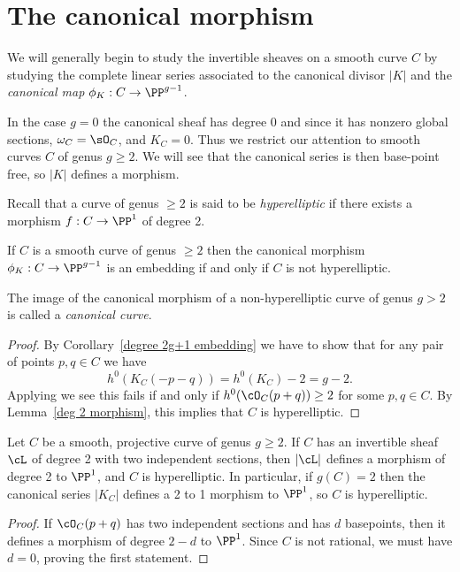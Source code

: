 \section{The canonical morphism}

We will generally begin to study the invertible sheaves on a smooth curve $C$ by studying the complete linear series associated to the canonical divisor $|K|$ and the \emph{canonical map}
 $\phi_K : C \to \PP^{g-1}$. 
 
 In the case $g=0$ the canonical sheaf has degree 0 and since it has nonzero global sections, 
 $\omega_C = \sO_C$, and $K_C = 0$. Thus we restrict our attention to smooth curves $C$ of genus $g\geq 2$. We will see
 that the canonical series is then base-point free, so $|K|$ defines a morphism.

Recall that a curve of genus $\geq 2$
is said to be \emph{hyperelliptic} if there exists a morphism $f: C \to \PP^1$ of degree 2. 


\begin{theorem}\label{canonical series is very ample}
If $C$ is a smooth curve of genus $\geq 2$ then the canonical morphism $\phi_K : C \to \PP^{g-1}$ is an embedding if and only if $C$ is not hyperelliptic. 
\end{theorem}

The image of the canonical morphism of a non-hyperelliptic curve of genus $g>2$ is called a \emph{canonical curve}.

\begin{proof}
By Corollary~\ref{degree 2g+1 embedding} we have to show that for any pair of points $p, q \in C$ we have
$$
h^0(K_C(-p-q)) = h^0(K_C)-2 = g-2.
$$
Applying \trr we see this fails if and only if $h^0(\cO_C(p+q)) \geq 2$ for some $p,q \in C$. By Lemma~\ref{deg 2 morphism}, this implies that $C$ is hyperelliptic.
\end{proof}

\begin{lemma}\label{deg 2 morphism}
Let $C$ be a smooth, projective curve of genus $g\geq 2$. If $C$ has an invertible sheaf $\cL$ of degree 2 with two independent sections, then
$|\cL|$ defines a morphism of degree 2 to $\PP^{1}$, and $C$ is hyperelliptic. In particular, if $g(C) = 2$ then the canonical series $|K_{C}|$ defines a 2 to 1 morphism to $\PP^{1}$, so $C$ is hyperelliptic.
\end{lemma}

\begin{proof}
If $\cO_C(p+q)$ has two independent sections and has $d$ basepoints, then it defines a morphism of degree $2-d$ to $\PP^1$. Since $C$ is not rational,
we must have $d=0$, proving the first statement. 
\end{proof}

